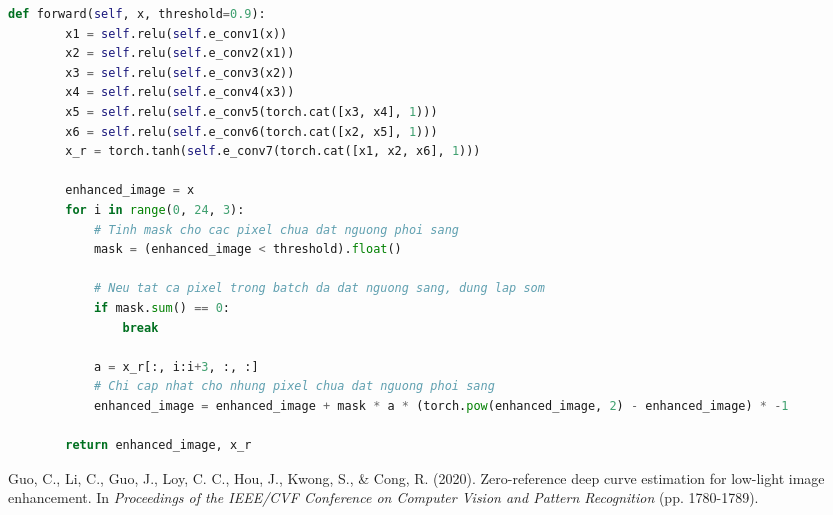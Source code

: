 \documentclass[a4paper]{article}
\begin{document}
\begin{lstlisting}[language=Python, caption=Mã nguồn forward tối ưu hóa bằng Mặt nạ Thích ứng và Dừng sớm]
    def forward(self, x, threshold=0.9):
        x1 = self.relu(self.e_conv1(x))
        x2 = self.relu(self.e_conv2(x1))
        x3 = self.relu(self.e_conv3(x2))
        x4 = self.relu(self.e_conv4(x3))
        x5 = self.relu(self.e_conv5(torch.cat([x3, x4], 1)))
        x6 = self.relu(self.e_conv6(torch.cat([x2, x5], 1)))
        x_r = torch.tanh(self.e_conv7(torch.cat([x1, x2, x6], 1)))

        enhanced_image = x
        for i in range(0, 24, 3):
            # Tinh mask cho cac pixel chua dat nguong phoi sang
            mask = (enhanced_image < threshold).float()
            
            # Neu tat ca pixel trong batch da dat nguong sang, dung lap som
            if mask.sum() == 0:
                break
                
            a = x_r[:, i:i+3, :, :]
            # Chi cap nhat cho nhung pixel chua dat nguong phoi sang
            enhanced_image = enhanced_image + mask * a * (torch.pow(enhanced_image, 2) - enhanced_image) * -1

        return enhanced_image, x_r
\end{lstlisting}


\clearpage

\begin{thebibliography}{99}
Guo, C., Li, C., Guo, J., Loy, C. C., Hou, J., Kwong, S., \& Cong, R. (2020). Zero-reference deep curve estimation for low-light image enhancement. In \textit{Proceedings of the IEEE/CVF Conference on Computer Vision and Pattern Recognition} (pp. 1780-1789).

\end{thebibliography}
\end{document}
